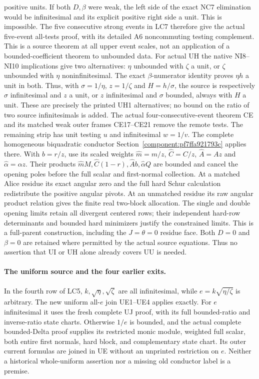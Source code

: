 positive units.  If both \(D,\beta\) were weak, the left side of
the exact NC7 elimination would be infinitesimal and its
explicit positive right side a unit.  This is impossible.
The five consecutive strong events in LC7 therefore give the
actual five-event all-tests proof, with its detailed A6
noncommuting testing complement.
This is a source theorem at all upper event scales, not an
application of a bounded-coefficient theorem to unbounded data.
For actual UH the native NI8--NI10 implications give two
alternatives: \(\eta\) unbounded with \(\zeta\) a unit, or
\(\zeta\) unbounded with \(\eta\) noninfinitesimal.
The exact \(\beta\)-numerator identity proves \(\eta h\) a
unit in both.  Thus, with \(\sigma=1/\eta\), \(z=1/\zeta\)
and \(H=h/\sigma\), the source is respectively
\(\sigma\) infinitesimal and \(z\) a unit, or \(z\)
infinitesimal and \(\sigma\) bounded, always with \(H\)
a unit.  These are precisely the printed UH1 alternatives;
no bound on the ratio of two source infinitesimals is added.
The actual four-consecutive-event theorem CE and its
matched weak outer frames CE17--CE21 remove the remote tests.
The remaining strip has unit testing \(u\) and infinitesimal
\(w=1/v\).  The complete homogeneous biquadratic conductor
Section~\ref{component:pf7ffa921793c} applies there.
With \(b=r/z\), use its scaled weights
\(\widehat m=m/z\), \(\widehat C=C/z\),
\(\widehat A=Az\) and \(\widehat\alpha=\alpha z\).
Their products
\(\widehat mM,\widehat C(1-r),\widehat A b,\widehat\alpha Q\)
are bounded and cancel the opening poles before the full
scalar and first-normal collection.
At a matched Alice residue its exact angular zero and
the full hard Schur calculation redistribute the positive
angular pivots.  At an unmatched residue its raw angular
product relation gives the finite real two-block allocation.
The single and double opening limits retain all divergent
centered rows; their independent hard-row determinants and
bounded hard minimizers justify the constrained limits.
This is a full-parent construction, including the
\(J=\theta=0\) residue face.
Both \(D=0\) and \(\beta=0\) are retained where permitted by the
actual source equations.  Thus no assertion that UI or UH alone
already covers UU is needed.

\paragraph{The uniform source and the four earlier exits.}
In the fourth row of LC5, \(k,\sqrt\eta,\sqrt\zeta\) are all
infinitesimal, while \(e=k\sqrt{\eta/\zeta}\) is arbitrary.
The new uniform all-\(e\) join UE1--UE4 applies exactly.
For \(e\) infinitesimal it uses the fresh complete UJ proof,
with its full bounded-ratio and inverse-ratio state charts.
Otherwise \(1/e\) is bounded, and the actual complete
bounded-Delta proof supplies its restricted monic module,
weighted full scalar, both entire first normals, hard block,
and complementary state chart.  Its outer current formulas
are joined in UE without an unprinted restriction on \(e\).
Neither a historical whole-uniform assertion nor a missing
old conductor label is a premise.

